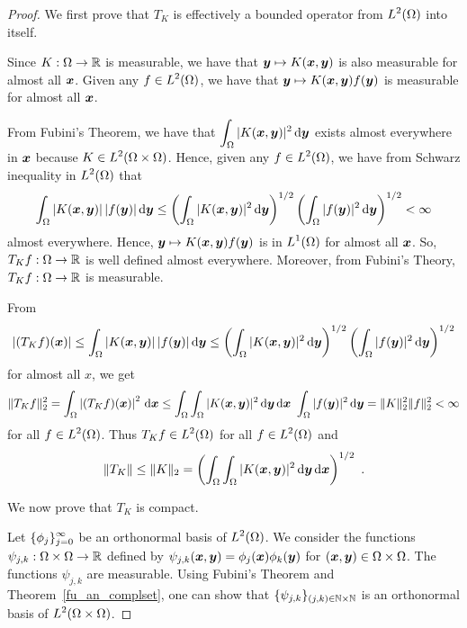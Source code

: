 \begin{proof}
 We first prove that $T_K$ is effectively a bounded operator
from $\displaystyle L^2(\Omega)$ into itself.

Since $K:\Omega \time \Omega \to \RR$ is measurable, we have that
${\bm{y}} \mapsto K({\bm{x}},{\bm{y}})$ is also measurable for almost all
${\bm{x}}$.  Given any $\displaystyle f\in L^2(\Omega)$, we have that
${\bm{y}} \mapsto K({\bm{x}},{\bm{y}})f({\bm{y}})$ is
measurable for almost all ${\bm{x}}$.

From Fubini's Theorem, we have that
$\displaystyle \int_{\Omega} |K({\bm{x}},{\bm{y}})|^2\,\mathrm{d}{{\bm{y}}}$
exists almost everywhere in ${\bm{x}}$ because
$\displaystyle K \in L^2(\Omega\times \Omega)$.  Hence, given any
$\displaystyle f \in L^2(\Omega)$, we have from Schwarz inequality in
$\displaystyle L^2(\Omega)$ that
\[
\int_{\Omega} |K({\bm{x}},{\bm{y}})|\,|f({\bm{y}})| \,\mathrm{d}{{\bm{y}}}
\leq \left(\int_{\Omega} |K({\bm{x}},{\bm{y}})|^2\,\mathrm{d}{{\bm{y}}}\right)^{1/2}
\left(\int_{\Omega} |f({\bm{y}})|^2\,\mathrm{d}{{\bm{y}}}\right)^{1/2} < \infty
\]
almost everywhere.  Hence,
${\bm{y}} \mapsto K({\bm{x}},{\bm{y}})f({\bm{y}})$ is in
$\displaystyle L^1(\Omega)$
for almost all ${\bm{x}}$.  So, $T_K f:\Omega \to \mathbb{R}$ is well defined
almost everywhere.  Moreover, from Fubini's Theory,
$T_K f:\Omega \to \mathbb{R}$ is measurable. 

From
\[
\left| (T_K f)({\bm{x}}) \right|
\leq \int_{\Omega} |K({\bm{x}},{\bm{y}})|\,|f({\bm{y}})| \,\mathrm{d}{{\bm{y}}}
\leq \left(\int_{\Omega} |K({\bm{x}},{\bm{y}})|^2\,\mathrm{d}{{\bm{y}}}\right)^{1/2}
\left(\int_{\Omega} |f({\bm{y}})|^2\,\mathrm{d}{{\bm{y}}}\right)^{1/2}
\]
for almost all $x$, we get
\[
\| T_K f \|_2^2 =
\int_{\Omega} \left| (T_K f)({\bm{x}}) \right|^2 \,\mathrm{d}{{\bm{x}}}
\leq \int_{\Omega}\int_{\Omega} |K({\bm{x}},{\bm{y}})|^2\,\mathrm{d}{{\bm{y}}}\,\mathrm{d}{{\bm{x}}}
\ \int_{\Omega} |f({\bm{y}})|^2\,\mathrm{d}{{\bm{y}}}
= \| K \|_2^2 \|f\|_2^2 < \infty
\]
for all $\displaystyle f\in L^2(\Omega)$.  Thus
$\displaystyle T_K f \in L^2(\Omega)$ for all
$\displaystyle f\in L^2(\Omega)$ and
\begin{equation} \label{faHilbSchA}
\|T_K \| \leq \|K\|_2
= \left( \int_{\Omega}\int_{\Omega}
|K(\VEC{x},\VEC{y})|^2\dx{\VEC{y}}\dx{\VEC{x}} \right)^{1/2} \ .
\end{equation}

 We now prove that $T_K$ is compact.

Let $\displaystyle \{\phi_j\}_{j=0}^\infty$ be an orthonormal basis of
$\displaystyle L^2(\Omega)$.  We consider the functions
$\psi_{j,k}:\Omega \times \Omega \to \mathbb{R}$ defined by
$\displaystyle \psi_{j,k}({\bm{x}},{\bm{y}}) = \phi_j({\bm{x}})\phi_k({\bm{y}})$ for
$({\bm{x}},{\bm{y}}) \in \Omega\times \Omega$.  The functions
$\psi_{j,k}$ are measurable.  Using Fubini's Theorem and
Theorem~\ref{fu_an_complset}, one can show that 
$\displaystyle \{\psi_{j,k}\}_{(j,k)\in \mathbb{N}\times \mathbb{N}}$ is an
orthonormal basis of $\displaystyle L^2(\Omega \times \Omega)$.


\end{proof}
